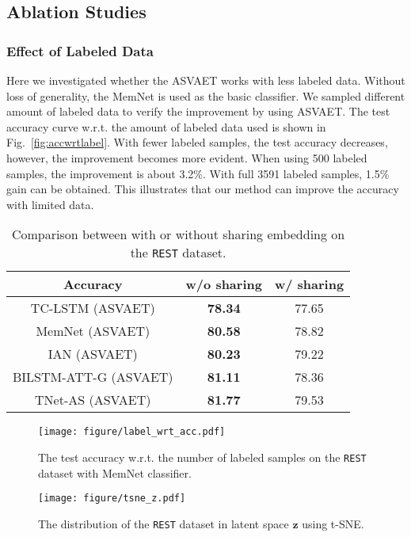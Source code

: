 \documentclass[11pt,a4paper]{article}
\begin{document}
\subsection{Ablation Studies}
\subsubsection{Effect of Labeled Data}
Here we investigated whether the ASVAET works with less labeled data.
Without loss of generality,  the MemNet is used as the basic classifier.
We sampled different amount of labeled data to verify the improvement by using ASVAET.
The test accuracy curve w.r.t. the amount of labeled data used is shown in Fig.~\ref{fig:accwrtlabel}.
With fewer labeled samples, the test accuracy decreases, however, the improvement becomes more evident.
When using 500 labeled samples, the improvement is about 3.2\%.
With full 3591 labeled samples, 1.5\% gain can be obtained.
This illustrates that our method can improve the accuracy with limited data.

\begin{table}
	\small
	\centering
	\begin{tabular}{c c c}
		\toprule
		Accuracy  & w/o sharing & w/ sharing \\
		\hline
		TC-LSTM (ASVAET) & \textbf{78.34} & 77.65 \\
		MemNet (ASVAET) & \textbf{80.58} & 78.82 \\
		IAN (ASVAET) & \textbf{80.23} & 79.22\\
		BILSTM-ATT-G (ASVAET) & \textbf{81.11} & 78.36 \\
		TNet-AS (ASVAET) & \textbf{81.77} & 79.53 \\
		\toprule
	\end{tabular}
	\caption{Comparison between with or without sharing embedding on the \texttt{REST} dataset.}\label{tab:emb}
\end{table}


\begin{figure}
\centering
	\texttt{[image: figure/label\_wrt\_acc.pdf]}
	\caption{The test accuracy w.r.t. the number of labeled samples on the \texttt{REST} dataset with MemNet classifier.}\label{fig:accwrtlabel}
\centering
	\texttt{[image: figure/tsne\_z.pdf]}
	\caption{The distribution of the \texttt{REST} dataset in latent space $\mathbf{z}$ using t-SNE.}\label{fig:tsne}
\end{figure}
\end{document}
